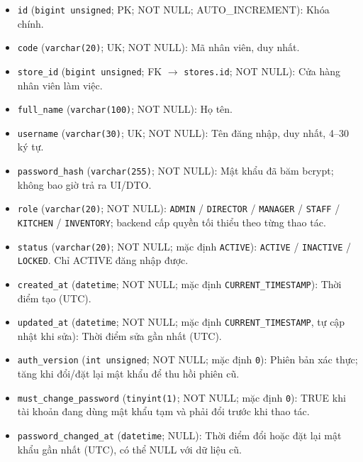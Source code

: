 \begin{itemize}

\item \texttt{id} (\texttt{bigint unsigned}; PK; NOT NULL; AUTO_INCREMENT): Khóa chính.

\item \texttt{code} (\texttt{varchar(20)}; UK; NOT NULL): Mã nhân viên, duy nhất.

\item \texttt{store\_id} (\texttt{bigint unsigned}; FK $\rightarrow$ \texttt{stores.id}; NOT NULL): Cửa hàng nhân viên làm việc.

\item \texttt{full\_name} (\texttt{varchar(100)}; NOT NULL): Họ tên.

\item \texttt{username} (\texttt{varchar(30)}; UK; NOT NULL): Tên đăng nhập, duy nhất, 4–30 ký tự.

\item \texttt{password\_hash} (\texttt{varchar(255)}; NOT NULL): Mật khẩu đã băm bcrypt; không bao giờ trả ra UI/DTO.

\item \texttt{role} (\texttt{varchar(20)}; NOT NULL): \texttt{ADMIN} / \texttt{DIRECTOR} / \texttt{MANAGER} / \texttt{STAFF} / \texttt{KITCHEN} / \texttt{INVENTORY}; backend cấp quyền tối thiểu theo từng thao tác.

\item \texttt{status} (\texttt{varchar(20)}; NOT NULL; mặc định \texttt{ACTIVE}): \texttt{ACTIVE} / \texttt{INACTIVE} / \texttt{LOCKED}. Chỉ ACTIVE đăng nhập được.

\item \texttt{created\_at} (\texttt{datetime}; NOT NULL; mặc định \texttt{CURRENT\_TIMESTAMP}): Thời điểm tạo (UTC).

\item \texttt{updated\_at} (\texttt{datetime}; NOT NULL; mặc định \texttt{CURRENT\_TIMESTAMP}, tự cập nhật khi sửa): Thời điểm sửa gần nhất (UTC).

\item \texttt{auth\_version} (\texttt{int unsigned}; NOT NULL; mặc định \texttt{0}): Phiên bản xác thực; tăng khi đổi/đặt lại mật khẩu để thu hồi phiên cũ.

\item \texttt{must\_change\_password} (\texttt{tinyint(1)}; NOT NULL; mặc định \texttt{0}): TRUE khi tài khoản đang dùng mật khẩu tạm và phải đổi trước khi thao tác.

\item \texttt{password\_changed\_at} (\texttt{datetime}; NULL): Thời điểm đổi hoặc đặt lại mật khẩu gần nhất (UTC), có thể NULL với dữ liệu cũ.

\end{itemize}

